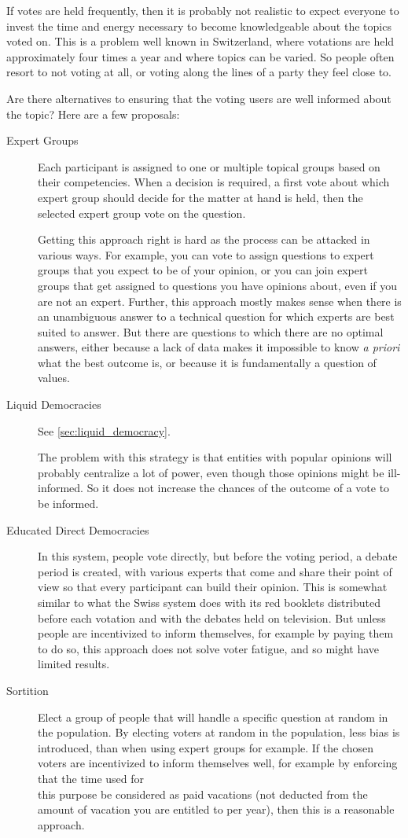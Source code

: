 If votes are held frequently, then it is probably not realistic to expect everyone to invest the time and energy necessary to become knowledgeable about the topics voted on.
This is a problem well known in Switzerland, where votations are held approximately four times a year and where topics can be varied.
So people often resort to not voting at all, or voting along the lines of a party they feel close to.

Are there alternatives to ensuring that the voting users are well informed about the topic?
Here are a few proposals:

\begin{description}
  \item[Expert Groups]
    Each participant is assigned to one or multiple topical groups based on their competencies.
    When a decision is required, a first vote about which expert group should decide for the matter at hand is held, then the selected expert group vote on the question.
    
    Getting this approach right is hard as the process can be attacked in various ways.
    For example, you can vote to assign questions to expert groups that you expect to be of your opinion, or you can join expert groups that get assigned to questions you have opinions about, even if you are not an expert.
    Further, this approach mostly makes sense when there is an unambiguous answer to a technical question for which experts are best suited to answer.
    But there are questions to which there are no optimal answers, either because a lack of data makes it impossible to know \textit{a priori} what the best outcome is, or because it is fundamentally a question of values.
  \item[Liquid Democracies]
    See \cref{sec:liquid_democracy}.
    
    The problem with this strategy is that entities with popular opinions will probably centralize a lot of power, even though those opinions might be ill-informed.
    So it does not increase the chances of the outcome of a vote to be informed.
  \item[Educated Direct Democracies]
    In this system, people vote directly, but before the voting period, a debate period is created, with various experts that come and share their point of view so that every participant can build their opinion.
    This is somewhat similar to what the Swiss system does with its red booklets distributed before each votation and with the debates held on television.
    But unless people are incentivized to inform themselves, for example by paying them to do so, this approach does not solve voter fatigue, and so might have limited results.
  \item[Sortition]
    Elect a group of people that will handle a specific question at random in the population.
    By electing voters at random in the population, less bias is introduced, than when using expert groups for example.
    If the chosen voters are incentivized to inform themselves well, for example by enforcing that the time used for\\this purpose be considered as paid vacations (not deducted from the amount of vacation you are entitled to per year), then this is a reasonable approach.


\end{description}
